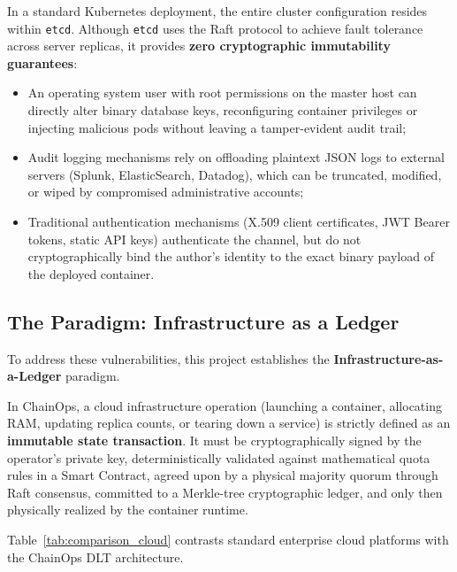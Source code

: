 \documentclass[a4paper,12pt]{article}
\begin{document}
In a standard Kubernetes deployment, the entire cluster configuration resides within \texttt{etcd}. Although \texttt{etcd} uses the Raft protocol to achieve fault tolerance across server replicas, it provides \textbf{zero cryptographic immutability guarantees}:
\begin{itemize}[leftmargin=1.2cm]
    \item An operating system user with root permissions on the master host can directly alter binary database keys, reconfiguring container privileges or injecting malicious pods without leaving a tamper-evident audit trail;
    \item Audit logging mechanisms rely on offloading plaintext JSON logs to external servers (Splunk, ElasticSearch, Datadog), which can be truncated, modified, or wiped by compromised administrative accounts;
    \item Traditional authentication mechanisms (X.509 client certificates, JWT Bearer tokens, static API keys) authenticate the channel, but do not cryptographically bind the author's identity to the exact binary payload of the deployed container.
\end{itemize}

\subsection{The Paradigm: Infrastructure as a Ledger}

To address these vulnerabilities, this project establishes the \textbf{Infrastructure-as-a-Ledger} paradigm.

\begin{calloutbox}
In ChainOps, a cloud infrastructure operation (launching a container, allocating RAM, updating replica counts, or tearing down a service) is strictly defined as an \textbf{immutable state transaction}. It must be cryptographically signed by the operator's private key, deterministically validated against mathematical quota rules in a Smart Contract, agreed upon by a physical majority quorum through Raft consensus, committed to a Merkle-tree cryptographic ledger, and only then physically realized by the container runtime.
\end{calloutbox}

Table~\ref{tab:comparison_cloud} contrasts standard enterprise cloud platforms with the ChainOps DLT architecture.
\end{document}
